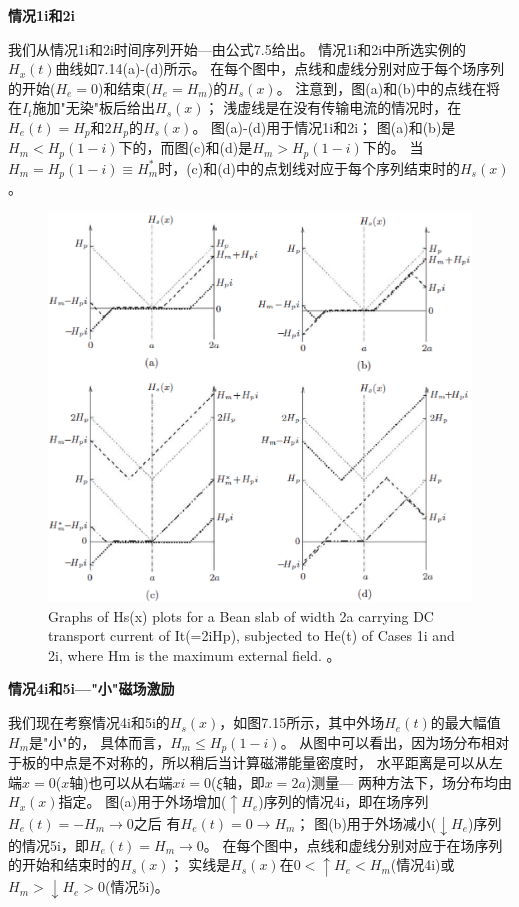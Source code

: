 \textbf{情况1i和2i}

我们从情况1i和2i时间序列开始---由公式7.5给出。
情况1i和2i中所选实例的$H_x(t)$曲线如7.14(a)-(d)所示。
在每个图中，点线和虚线分别对应于每个场序列的开始($H_e = 0$)和结束($H_e = H_m$)的$H_s(x)$。
注意到，图(a)和(b)中的点线在将在$I_t$施加"无染"板后给出$H_s(x)$；
浅虚线是在没有传输电流的情况时，在$H_e(t)=H_p$和$2H_p$的$H_s(x)$。
图(a)-(d)用于情况1i和2i； 图(a)和(b)是$H_m<H_p(1-i)$下的，而图(c)和(d)是$H_m> H_p(1-i)$下的。
当$H_m = H_p(1-i)\equiv H_m^*$时，(c)和(d)中的点划线对应于每个序列结束时的$H_s(x)$。
\begin{figure}[htbp]
	\centering
	\includegraphics[scale=0.6]{chpt7/figs/fig7.14.eps}
	\caption{Graphs of Hs(x) plots for a Bean slab of width 2a carrying DC transport
		current of It(=2iHp), subjected to He(t) of Cases 1i and 2i, where Hm is the maximum
		external field. 。}
\end{figure}

\textbf{情况4i和5i---"小"磁场激励}

我们现在考察情况4i和5i的$H_s(x)$，如图7.15所示，其中外场$H_e(t)$的最大幅值$H_m$是"小"的，
具体而言，$H_m\le H_p(1-i)$。
从图中可以看出，因为场分布相对于板的中点是不对称的，所以稍后当计算磁滞能量密度时，
水平距离是可以从左端$x = 0$($x$轴)也可以从右端$xi= 0$($\xi$轴，即$x=2a$)测量---
两种方法下，场分布均由$H_x(x)$指定。
图(a)用于外场增加($\uparrow H_e$)序列的情况4i，即在场序列$H_e(t)=-H_m\rightarrow 0$之后
有$H_e(t)= 0\rightarrow H_m$；
图(b)用于外场减小($\downarrow H_e$)序列的情况5i，即$H_e(t)= H_m\rightarrow 0$。
在每个图中，点线和虚线分别对应于在场序列的开始和结束时的$H_s(x)$；
实线是$H_s(x)$在$0<\uparrow H_e<H_m$(情况4i)或$H_m>\downarrow H_e> 0$(情况5i)。

